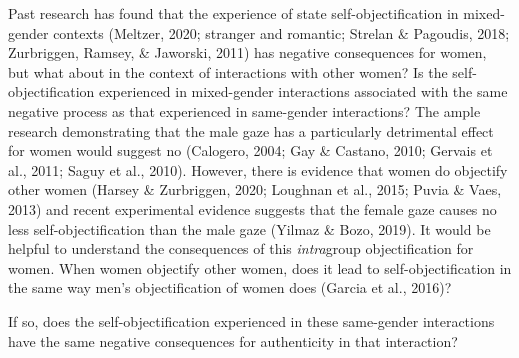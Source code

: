 \documentclass[man]{apa6}
\begin{document}
Past research has found that the experience of state
self-objectification in mixed-gender contexts (Meltzer, 2020; stranger
and romantic; Strelan \& Pagoudis, 2018; Zurbriggen, Ramsey, \&
Jaworski, 2011) has negative consequences for women, but what about in
the context of interactions with other women? Is the
self-objectification experienced in mixed-gender interactions associated
with the same negative process as that experienced in same-gender
interactions? The ample research demonstrating that the male gaze has a
particularly detrimental effect for women would suggest no (Calogero,
2004; Gay \& Castano, 2010; Gervais et al., 2011; Saguy et al., 2010).
However, there is evidence that women do objectify other women (Harsey
\& Zurbriggen, 2020; Loughnan et al., 2015; Puvia \& Vaes, 2013) and
recent experimental evidence suggests that the female gaze causes no
less self-objectification than the male gaze (Yilmaz \& Bozo, 2019). It
would be helpful to understand the consequences of this
\emph{intra}group objectification for women. When women objectify other
women, does it lead to self-objectification in the same way men's
objectification of women does (Garcia et al., 2016)?

If so, does the self-objectification experienced in these same-gender
interactions have the same negative consequences for authenticity in
that interaction?
\end{document}
